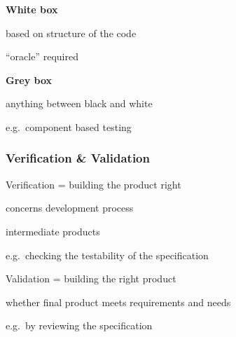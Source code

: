 \textbf{White box}
\begin{itemize*}
	\item based on structure of the code
	\item “oracle” required
\end{itemize*}

\textbf{Grey box}
\begin{itemize*}
	\item anything between black and white
	\item e.g.\ component based testing
\end{itemize*}

\subsubsection{Verification \& Validation}
\begin{itemize*}
	\item Verification = building the product right
	\begin{itemize*}
		\item concerns development process
		\item intermediate products
		\item e.g.\ checking the testability of the specification
	\end{itemize*}
	\item Validation = building the right product
	\begin{itemize*}
		\item whether final product meets requirements and needs
		\item e.g.\ by reviewing the specification
	\end{itemize*}
\end{itemize*}




